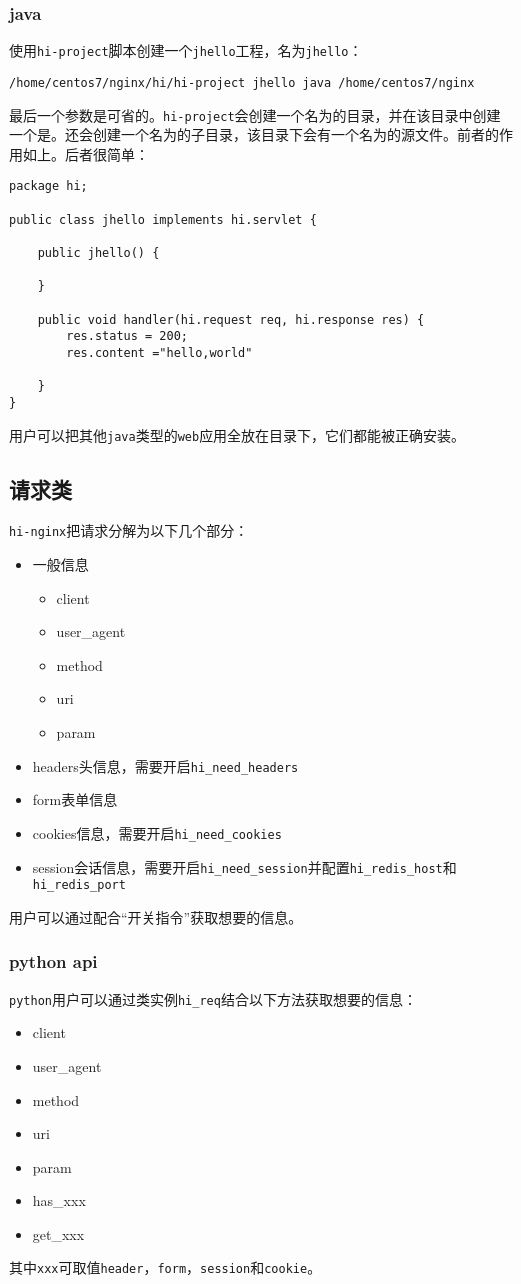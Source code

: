 \subsubsection{java}
使用\texttt{hi-project}脚本创建一个\texttt{jhello}工程，名为\texttt{jhello}：
\begin{lstlisting}
/home/centos7/nginx/hi/hi-project jhello java /home/centos7/nginx
\end{lstlisting}
最后一个参数是可省的。\texttt{hi-project}会创建一个名为的目录，并在该目录中创建一个是。还会创建一个名为的子目录，该目录下会有一个名为的源文件。前者的作用如上。后者很简单：
\begin{lstlisting}
package hi;

public class jhello implements hi.servlet {

    public jhello() {

    }

    public void handler(hi.request req, hi.response res) {
        res.status = 200;
        res.content ="hello,world"

    }
}
\end{lstlisting}
用户可以把其他\texttt{java}类型的\texttt{web}应用全放在目录下，它们都能被正确安装。

\subsection{请求类}
\texttt{hi-nginx}把请求分解为以下几个部分：
\begin{itemize}
\item 一般信息
	\begin{itemize}
		\item client
		\item user_agent
		\item method
		\item uri
		\item param
	\end{itemize}
\item headers头信息，需要开启\texttt{hi_need_headers}
\item form表单信息
\item cookies信息，需要开启\texttt{hi_need_cookies}
\item session会话信息，需要开启\texttt{hi_need_session}并配置\texttt{hi_redis_host}和\texttt{hi_redis_port}
\end{itemize}
用户可以通过配合“开关指令”获取想要的信息。
\subsubsection{python api}
\texttt{python}用户可以通过类实例\texttt{hi_req}结合以下方法获取想要的信息：
\begin{itemize}
\item client
\item user_agent
\item method
\item uri
\item param
\item has_xxx 
\item get_xxx
\end{itemize}
其中\texttt{xxx}可取值\texttt{header}，\texttt{form}，\texttt{session}和\texttt{cookie}。
